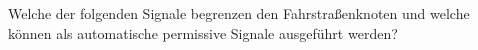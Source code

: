 

Welche der folgenden Signale begrenzen den Fahrstraßenknoten und welche können als automatische permissive Signale ausgeführt werden?

